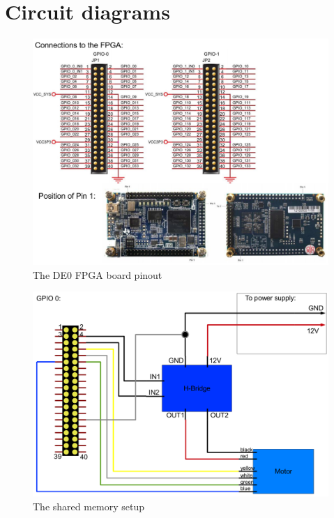 
\section{Circuit diagrams} \label{appendix:circuits}

\begin{figure}[h]\label{appendix:pic_circuits_nano}
  \caption{The DE0 FPGA board pinout}
  \centering
    \includegraphics[width=1.0\textwidth]{figures/wiring_nano.png}
\end{figure}

\begin{figure}[h]\label{appendix:pic_circuits_nano_gpio0}
  \caption{The shared memory setup}
  \centering
    \includegraphics[width=1.0\textwidth]{figures/wiring_nano_gpio0.png}
\end{figure}

